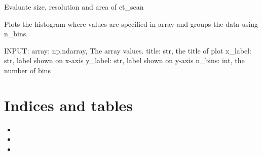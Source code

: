 \documentclass[letterpaper,10pt,english]{sphinxmanual}
\begin{document}
\begin{fulllineitems}
\label{\detokenize{index:utils.pl_get_dataset_stats}}
Evaluate size, resolution and area of ct\_scan

\end{fulllineitems}


\begin{fulllineitems}
\label{\detokenize{index:utils.plot_hist}}
Plots the histogram where values are specified in array and groups
the data using n\_bins.

INPUT:
array: np.ndarray, The array values.
title: str, the title of plot
x\_label: str, label shown on x-axis
y\_label: str, label shown on y-axis
n\_bins: int, the number of bins

\end{fulllineitems}



\chapter{Indices and tables}
\label{\detokenize{index:indices-and-tables}}\begin{itemize}
\item {} 

\item {} 

\item {} 

\end{itemize}


\renewcommand{\indexname}{Python Module Index}
\begin{sphinxtheindex}
\let\bigletter\sphinxstyleindexlettergroup
\bigletter{u}
\item\relax{}
\end{sphinxtheindex}

\renewcommand{\indexname}{Index}
\printindex
\end{document}
